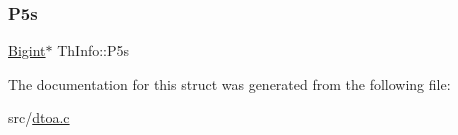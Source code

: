 \mbox{\label{struct_th_info_a0c079d4c3cf2296a7d6b7b2a1d80d841}} 
\subsubsection{\texorpdfstring{P5s}{P5s}}
{\footnotesize\ttfamily \hyperlink{struct_bigint}{Bigint}$\ast$ Th\+Info\+::\+P5s}



The documentation for this struct was generated from the following file\+:\begin{DoxyCompactItemize}
\item 
src/\hyperlink{dtoa_8c}{dtoa.\+c}\end{DoxyCompactItemize}
